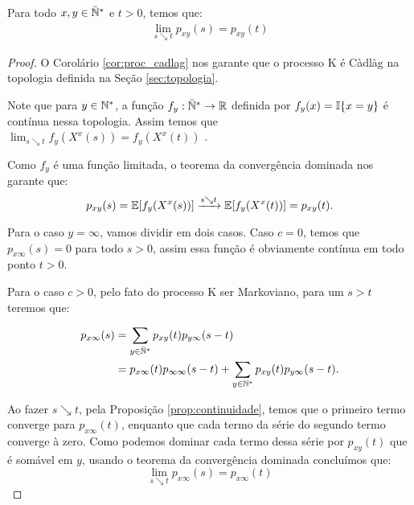 \begin{lema}
  \label{lema:cont_direita_prob}
  Para todo $x, y \in {\mathbb{\bar{N}^*}}$ e $t > 0$, temos que:
  \begin{align}
    \lim_{s \searrow t} p_{x y} (s) = p_{x y} (t)
  \end{align}
\end{lema}
\begin{proof}
  O Corolário \ref{cor:proc_cadlag} nos garante que o processo K é
  Càdlàg na topologia definida na Seção \ref{sec:topologia}.

  Note que para $y \in {\mathbb{N^*}}$, a função $f_y: {\mathbb{\bar{N}^*}} \to {\mathbb{R}}$ definida por
  $f_y(x) = {\mathbb{I}}\{ x = y\}$ é contínua nessa topologia. Assim temos
  que $\lim_{s \searrow t} f_y(X^x(s)) = f_y (X^x(t))$ \qc.

  Como $f_y$ é uma função limitada, o teorema da convergência dominada
  nos garante que:
  \begin{displaymath}
    p_{x y} (s) = {\mathbb{E}}[f_y(X^x(s))] \xrightarrow{s \searrow t} {\mathbb{E}}[f_y
    (X^x(t))] = p_{x y} (t).
  \end{displaymath}

  Para o caso $y = \infty$, vamos dividir em dois casos.  Caso $c =
  0$, temos que $p_{x \infty} (s) = 0$ para todo $s > 0$, assim essa
  função é obviamente contínua em todo ponto $t > 0$.

  Para o caso $c > 0$, pelo fato do processo K ser Markoviano, para um
  $s > t$ teremos que:

  \begin{align*}
    p_{x \infty} (s) &= \sum_{y \in {\mathbb{\bar{N}^*}}} p_{x y} (t) p_{y \infty}
    (s - t) \\
    &= p_{x \infty} (t) p_{\infty \infty} (s - t) + 
    \sum_{y \in {\mathbb{N^*}}} p_{x y} (t) p_{y \infty} (s - t). \\
  \end{align*}


  Ao fazer $s \searrow t$, pela Proposição \ref{prop:continuidade},
  temos que o primeiro termo converge para $p_{x \infty}(t)$, enquanto
  que cada termo da série do segundo termo converge à zero. Como
  podemos dominar cada termo dessa série por $p_{x y} (t)$ que é
  somável em $y$, usando o teorema da convergência dominada concluímos
  que:
  \begin{displaymath}
    \lim_{s \searrow t} p_{x \infty} (s) = p_{x \infty} (t)
  \end{displaymath} 
\end{proof}

